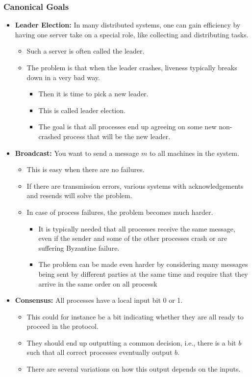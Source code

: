 \documentclass[11pt]{article}
\begin{document}
\subsubsection{Canonical Goals}
\label{sec:org56cae34}
\begin{itemize}
\item \textbf{Leader Election:} In many distributed systems, one can gain efficiency by having one server take on a special role, like collecting and distributing tasks.
\begin{itemize}
\item Such a server is often called the leader.
\item The problem is that when the leader crashes, liveness typically breaks down in a very bad way. 
\begin{itemize}
\item Then it is time to pick a new leader.
\item This is called leader election.
\item The goal is that all processes end up agreeing on some new non-crashed process that will be the new leader.
\end{itemize}
\end{itemize}

\item \textbf{Broadcast:} You want to send a message \(m\) to all machines in the system.
\begin{itemize}
\item This is easy when there are no failures.
\item If there are transmission errors, various systems with acknowledgements and resends will solve the problem.
\item In case of process failures, the problem becomes much harder.
\begin{itemize}
\item It is typically needed that all processes receive the same message, even if the sender and some of the other processes crash or are suffering Byzantine failure.
\item The problem can be made even harder by considering many messages being sent by different parties at the same time and require that they arrive in the same order on all processk
\end{itemize}
\end{itemize}

\item \textbf{Consensus:} All processes have a local input bit 0 or 1.
\begin{itemize}
\item This could for instance be a bit indicating whether they are all ready to proceed in the protocol.
\item They should end up outputting a common decision, i.e., there is a bit \(b\) such that all correct processes eventually output \(b\).
\item There are several variations on how this output depends on the inputs.
\end{itemize}


\end{itemize}
\end{document}
